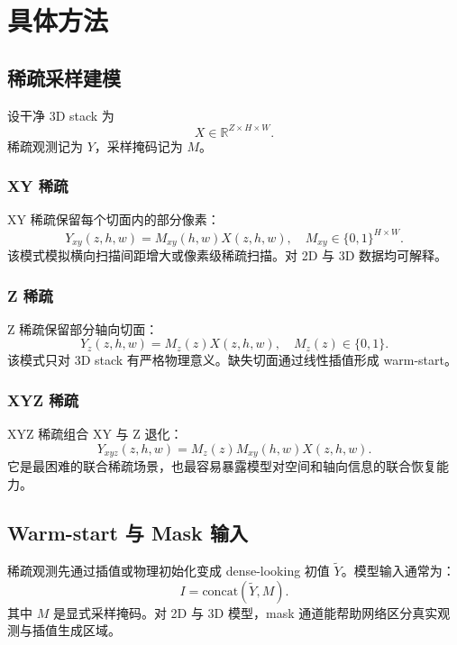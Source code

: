 \documentclass[UTF8, scheme=plain, 11pt, a4paper]{ctexart}
\newcommand{\R}{\mathbb{R}}
\begin{document}
\section{具体方法}

\subsection{稀疏采样建模}

设干净 3D stack 为
\begin{equation}
  X \in \R^{Z \times H \times W}.
\end{equation}
稀疏观测记为 $Y$，采样掩码记为 $M$。

\subsubsection{XY 稀疏}

XY 稀疏保留每个切面内的部分像素：
\begin{equation}
  Y_{xy}(z,h,w) = M_{xy}(h,w) X(z,h,w), \quad M_{xy} \in \{0,1\}^{H\times W}.
\end{equation}
该模式模拟横向扫描间距增大或像素级稀疏扫描。对 2D 与 3D 数据均可解释。

\subsubsection{Z 稀疏}

Z 稀疏保留部分轴向切面：
\begin{equation}
  Y_z(z,h,w) = M_z(z) X(z,h,w), \quad M_z(z) \in \{0,1\}.
\end{equation}
该模式只对 3D stack 有严格物理意义。缺失切面通过线性插值形成 warm-start。

\subsubsection{XYZ 稀疏}

XYZ 稀疏组合 XY 与 Z 退化：
\begin{equation}
  Y_{xyz}(z,h,w) = M_z(z) M_{xy}(h,w) X(z,h,w).
\end{equation}
它是最困难的联合稀疏场景，也最容易暴露模型对空间和轴向信息的联合恢复能力。

\subsection{Warm-start 与 Mask 输入}

稀疏观测先通过插值或物理初始化变成 dense-looking 初值 $\widetilde{Y}$。模型输入通常为：
\begin{equation}
  I = \mathrm{concat}(\widetilde{Y}, M).
\end{equation}
其中 $M$ 是显式采样掩码。对 2D 与 3D 模型，mask 通道能帮助网络区分真实观测与插值生成区域。
\end{document}
